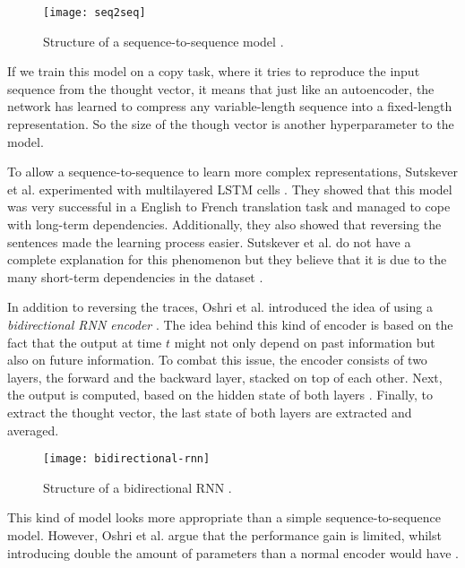 \begin{figure}[ht]
  \centering
  \texttt{[image: seq2seq]}
  \caption{Structure of a sequence-to-sequence model \cite{britz_2016_1}.}
  \label{fig:seq2seq}
\end{figure}

If we train this model on a copy task, where it tries to reproduce the input sequence from the thought vector, it means that just like an autoencoder,
the network has learned to compress any variable-length sequence into a fixed-length representation.
So the size of the though vector is another hyperparameter to the model.

To allow a sequence-to-sequence to learn more complex representations, Sutskever et al. experimented with multilayered LSTM cells \cite{sutskever_vinyals_le}.
They showed that this model was very successful in a English to French translation task and managed to cope with long-term dependencies.
Additionally, they also showed that reversing the sentences made the learning process easier.
Sutskever et al. do not have a complete explanation for this phenomenon but they believe that it is due to the many short-term dependencies in the dataset \cite{sutskever_vinyals_le}.

In addition to reversing the traces, Oshri et al. introduced the idea of using a \textit{bidirectional RNN encoder} \cite{rnnencoder}.
The idea behind this kind of encoder is based on the fact that the output at time $t$ might not only depend on past information but also on future information.
To combat this issue, the encoder consists of two layers, the forward and the backward layer, stacked on top of each other.
Next, the output is computed, based on the hidden state of both layers \cite{britz_2016}.
Finally, to extract the thought vector, the last state of both layers are extracted and averaged.

\begin{figure}[ht]
  \centering
  \texttt{[image: bidirectional-rnn]}
  \caption{Structure of a bidirectional RNN \cite{britz_2016}.}
  \label{fig:bidirectional-rnn}
\end{figure}

\newpage

This kind of model looks more appropriate than a simple sequence-to-sequence model.
However, Oshri et al. argue that the performance gain is limited, whilst introducing double the amount of parameters than a normal encoder would have \cite{rnnencoder}.

